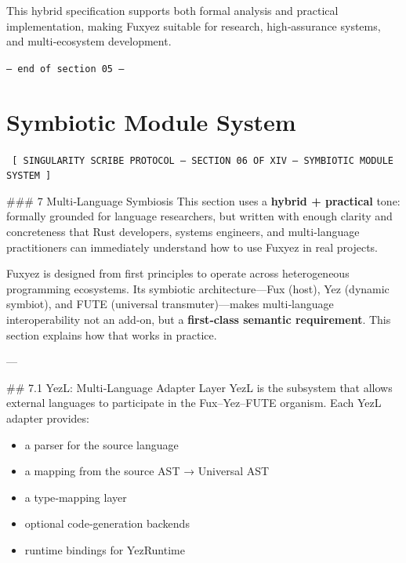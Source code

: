 This hybrid specification supports both formal analysis and practical implementation, making Fuxyez suitable for research, high‑assurance systems, and multi‑ecosystem development.
    
    \vspace{1cm}
    \begin{center}
    \color{alienPurple}\texttt{--- end of section 05 ---}
    \end{center}
    \clearpage
    

    \chapter*{Symbiotic Module System}
    
    
    \begin{glyphbox}
    \centering
    \color{neonCyan}\fontsize{8}{10}\selectfont\texttt{
    [ SINGULARITY SCRIBE PROTOCOL -- SECTION 06 OF XIV -- SYMBIOTIC MODULE SYSTEM ]
    }
    \end{glyphbox}
    \vspace{0.3cm}
    
    
    \#\#\# 7 Multi‑Language Symbiosis  
This section uses a \textbf{hybrid + practical} tone: formally grounded for language researchers, but written with enough clarity and concreteness that Rust developers, systems engineers, and multi‑language practitioners can immediately understand how to use Fuxyez in real projects.

Fuxyez is designed from first principles to operate across heterogeneous programming ecosystems. Its symbiotic architecture—Fux (host), Yez (dynamic symbiot), and FUTE (universal transmuter)—makes multi‑language interoperability not an add‑on, but a \textbf{first‑class semantic requirement}. This section explains how that works in practice.

---

\#\# 7.1 YezL: Multi‑Language Adapter Layer  
YezL is the subsystem that allows external languages to participate in the Fux–Yez–FUTE organism. Each YezL adapter provides:

\begin{itemize}
  \item a parser for the source language  
  \item a mapping from the source AST → Universal AST  
  \item a type‑mapping layer  
  \item optional code‑generation backends  
  \item runtime bindings for YezRuntime  
\end{itemize}

